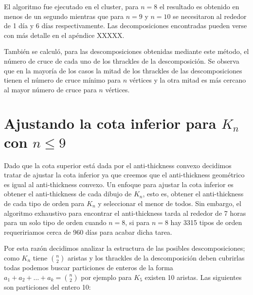 El algoritmo fue ejecutado en el cluster, para $n=8$ el resultado es obtenido en menos
de un segundo mientras que para $n=9$ y $n=10$ se necesitaron al rededor de
1 día y 6 días respectivamente. Las decomposiciones encontradas pueden verse con
más detalle en el apéndice XXXXX.

También se calculó, para las descomposiciones obtenidas mediante este método, el
número de cruce de cada uno de los thrackles de la descomposición. Se observa que
en la mayoría de los casos la mitad de los thrackles de las descomposiciones
tienen el número de cruce mínimo para $n$ vértices y la otra mitad es más
cercano al mayor número de cruce para $n$ vértices.

\section{Ajustando la cota inferior para $K_n$ con $n\leq 9$}

Dado que la cota superior está dada por el anti-thickness convexo decidimos tratar
de ajustar la cota inferior ya que creemos que el anti-thickness geométrico es igual
al anti-thickness convexo. Un enfoque para ajustar la cota inferior es obtener el
anti-thickness de cada dibujo de $K_n$, esto es, obtener el anti-thickness de cada
tipo de orden para $K_n$ y seleccionar el menor de todos. Sin embargo, el algoritmo
exhaustivo para encontrar el anti-thickness tarda al rededor de 7 horas para un solo
tipo de orden cuando $n=8$, si para $n=8$ hay 3315 tipos de orden requeririamos
cerca de 960 días para acabar dicha tarea.

Por esta razón decidimos analizar la estructura de las posibles descomposiciones;
como $K_n$ tiene $\binom{n}{2}$ aristas y los thrackles de la descomposición deben
cubrirlas todas podemos buscar particiones de enteros de la forma $a_1 + a_2 + \dots +
a_k = \binom{n}{2}$ por ejemplo para $K_5$ existen 10 aristas. Las siguientes son
particiones del entero 10:
